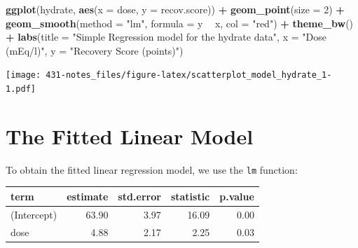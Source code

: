 \documentclass[
]{book}
\newenvironment{Shaded}{\begin{snugshade}}{\end{snugshade}}
\newcommand{\DataTypeTok}[1]{\textcolor[rgb]{0.13,0.29,0.53}{#1}}
\newcommand{\DecValTok}[1]{\textcolor[rgb]{0.00,0.00,0.81}{#1}}
\newcommand{\KeywordTok}[1]{\textcolor[rgb]{0.13,0.29,0.53}{\textbf{#1}}}
\newcommand{\NormalTok}[1]{#1}
\newcommand{\OperatorTok}[1]{\textcolor[rgb]{0.81,0.36,0.00}{\textbf{#1}}}
\newcommand{\StringTok}[1]{\textcolor[rgb]{0.31,0.60,0.02}{#1}}
\begin{document}
\begin{Shaded}
\begin{Highlighting}[]
\KeywordTok{ggplot}\NormalTok{(hydrate, }\KeywordTok{aes}\NormalTok{(}\DataTypeTok{x =}\NormalTok{ dose, }\DataTypeTok{y =}\NormalTok{ recov.score)) }\OperatorTok{+}
\StringTok{    }\KeywordTok{geom_point}\NormalTok{(}\DataTypeTok{size =} \DecValTok{2}\NormalTok{) }\OperatorTok{+}
\StringTok{    }\KeywordTok{geom_smooth}\NormalTok{(}\DataTypeTok{method =} \StringTok{"lm"}\NormalTok{, }\DataTypeTok{formula =}\NormalTok{ y }\OperatorTok{~}\StringTok{ }\NormalTok{x, }\DataTypeTok{col =} \StringTok{"red"}\NormalTok{) }\OperatorTok{+}
\StringTok{    }\KeywordTok{theme_bw}\NormalTok{() }\OperatorTok{+}
\StringTok{    }\KeywordTok{labs}\NormalTok{(}\DataTypeTok{title =} \StringTok{"Simple Regression model for the hydrate data"}\NormalTok{,}
         \DataTypeTok{x =} \StringTok{"Dose (mEq/l)"}\NormalTok{, }\DataTypeTok{y =} \StringTok{"Recovery Score (points)"}\NormalTok{)}
\end{Highlighting}
\end{Shaded}

\texttt{[image: 431-notes\_files/figure-latex/scatterplot\_model\_hydrate\_1-1.pdf]}

\hypertarget{the-fitted-linear-model}{%
\section{The Fitted Linear Model}\label{the-fitted-linear-model}}

To obtain the fitted linear regression model, we use the \texttt{lm} function:

\begin{Shaded}
\end{Shaded}

\begin{tabular}{l|r|r|r|r}
\hline
term & estimate & std.error & statistic & p.value\\
\hline
(Intercept) & 63.90 & 3.97 & 16.09 & 0.00\\
\hline
dose & 4.88 & 2.17 & 2.25 & 0.03\\
\hline
\end{tabular}
\end{document}
